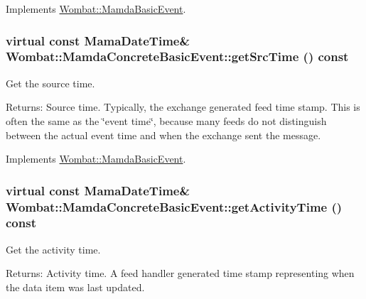 Implements \hyperlink{classWombat_1_1MamdaBasicEvent_7285491c2c657207a64b1b0449c0339b}{Wombat::Mamda\-Basic\-Event}.\hypertarget{classWombat_1_1MamdaConcreteBasicEvent_9456eab113f2c1b7d5cd7cc5183495d7}{
\subsubsection[getSrcTime]{\setlength{\rightskip}{0pt plus 5cm}virtual const Mama\-Date\-Time\& Wombat::Mamda\-Concrete\-Basic\-Event::get\-Src\-Time () const}}
\label{classWombat_1_1MamdaConcreteBasicEvent_9456eab113f2c1b7d5cd7cc5183495d7}


Get the source time. 

\begin{Desc}
\item[Returns:]Source time. Typically, the exchange generated feed time stamp. This is often the same as the \char`\"{}event time\char`\"{}, because many feeds do not distinguish between the actual event time and when the exchange sent the message. \end{Desc}


Implements \hyperlink{classWombat_1_1MamdaBasicEvent_60b5d51f3799c4762090505ef5b213e9}{Wombat::Mamda\-Basic\-Event}.\hypertarget{classWombat_1_1MamdaConcreteBasicEvent_ee6d9ec8ed5a8443b5f4812a7a5af0a3}{
\subsubsection[getActivityTime]{\setlength{\rightskip}{0pt plus 5cm}virtual const Mama\-Date\-Time\& Wombat::Mamda\-Concrete\-Basic\-Event::get\-Activity\-Time () const}}
\label{classWombat_1_1MamdaConcreteBasicEvent_ee6d9ec8ed5a8443b5f4812a7a5af0a3}


Get the activity time. 

\begin{Desc}
\item[Returns:]Activity time. A feed handler generated time stamp representing when the data item was last updated. \end{Desc}



